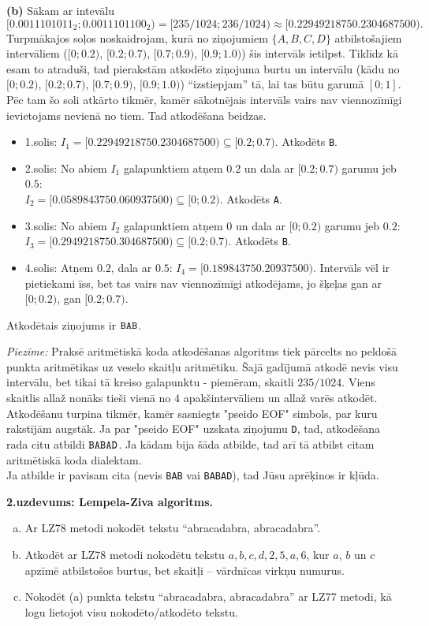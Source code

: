 \documentclass[11pt]{article}
\begin{document}
\noindent
{\bf (b)} Sākam ar intevālu 
$$[0.0011101011_2;0.0011101100_2) = [235/1024;236/1024) \approx [0.2294921875 0.2304687500).$$
Turpmākajos soļos noskaidrojam, kurā no ziņojumiem $\{ A,B,C,D \}$ atbilstošajiem intervāliem
($[0;0.2)$, $[0.2;0.7)$, $[0.7;0.9)$, $[0.9;1.0)$) šis intervāls ietilpst. 
Tiklīdz kā esam to atraduši, tad pierakstām atkodēto ziņojuma burtu un 
intervālu (kādu no $[0;0.2)$, $[0.2;0.7)$, $[0.7;0.9)$, $[0.9;1.0)$) ``izstiepjam'' tā, 
lai tas būtu garumā $[0;1]$. Pēc tam šo soli atkārto tikmēr, kamēr sākotnējais intervāls 
vairs nav viennozīmīgi ievietojams nevienā no tiem. Tad atkodēšana beidzas. 

\begin{itemize}
\item 1.solis: $I_1 = [0.2294921875 0.2304687500) \subseteq [0.2;0.7)$. Atkodēts {\tt B}.
\item 2.solis: No abiem $I_1$ galapunktiem atņem $0.2$ un dala ar $[0.2;0.7)$ garumu jeb $0.5$:\\
$I_2 = [0.058984375 0.060937500) \subseteq [0;0.2)$. Atkodēts {\tt A}.
\item 3.solis: No abiem $I_2$ galapunktiem atņem $0$ un dala ar $[0;0.2)$ garumu jeb $0.2$:\\
$I_3 = [0.294921875 0.304687500) \subseteq [0.2;0.7)$. Atkodēts {\tt B}.
\item 4.solis: Atņem $0.2$, dala ar $0.5$: $I_4 = [0.18984375 0.20937500)$. Intervāls vēl ir pietiekami 
īss, bet tas vairs nav viennozīmīgi atkodējams, jo šķeļas gan ar $[0;0.2)$, gan $[0.2;0.7)$. 
\end{itemize}

Atkodētais ziņojums ir ${\tt BAB}$. 

{\em Piezīme:} Praksē aritmētiskā koda atkodēšanas algoritms tiek pārcelts no peldošā punkta aritmētikas uz veselo skaitļu aritmētiku. 
Šajā gadījumā atkodē nevis visu intervālu, bet tikai tā kreiso galapunktu - piemēram, skaitli $235/1024$. 
Viens skaitlis allaž nonāks tieši vienā no $4$ apakšintervāliem un allaž varēs atkodēt.
Atkodēšanu turpina tikmēr, kamēr sasniegts "pseido EOF" simbols, par kuru rakstījām augstāk. 
Ja par "pseido EOF" uzskata ziņojumu {\tt D}, tad, atkodēšana rada citu atbildi ${\tt BABAD}$. 
Ja kādam bija šāda atbilde, tad arī tā atbilst citam aritmētiskā koda dialektam.\\
Ja atbilde ir pavisam cita (nevis {\tt BAB} vai {\tt BABAD}), tad Jūsu aprēķinos ir kļūda.




{\footnotesize 
\vspace{10ex}
\noindent
{\bf 2.uzdevums: Lempela-Ziva algoritms.}
\begin{enumerate}[(a)]
\item 
Ar LZ78 metodi nokodēt tekstu “abracadabra, abracadabra”.
\item Atkodēt ar LZ78 metodi nokodētu tekstu $a,b,c,d,2,5,a,6$, kur
$a$, $b$ un $c$ apzīmē atbilstošos burtus, bet skaitļi – vārdnīcas virkņu
numurus.
\item
Nokodēt (a) punkta tekstu “abracadabra, abracadabra” 
ar LZ77 metodi, kā logu lietojot visu nokodēto/atkodēto tekstu.
\end{enumerate}
}
\end{document}
